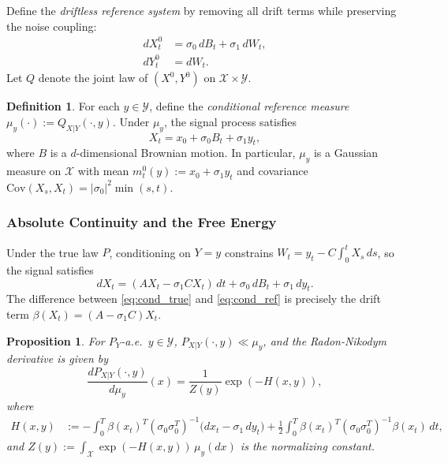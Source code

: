 \documentclass[12pt]{amsart}
\newtheorem{proposition}[theorem]{Proposition}
\theoremstyle{definition}
\newtheorem{definition}[theorem]{Definition}
\theoremstyle{remark}
\begin{document}
 Define the \emph{driftless reference system} by removing all drift terms while preserving the noise coupling:
\begin{align*}
    dX_t^0 &= \sigma_0 \, dB_t + \sigma_1 \, dW_t, \\
    dY_t^0 &= dW_t.
\end{align*}
Let $Q$ denote the joint law of $(X^0, Y^0)$ on $\mathcal{X} \times \mathcal{Y}$.

\begin{definition}\label{def:cond_ref}
    For each $y \in \mathcal{Y}$, define the \emph{conditional reference measure} $\mu_y(\cdot) := Q_{X|Y}(\cdot, y)$. Under $\mu_y$, the signal process satisfies
    \begin{equation}\label{eq:cond_ref}
        X_t = x_0 + \sigma_0 B_t + \sigma_1 y_t,
    \end{equation}
    where $B$ is a $d$-dimensional Brownian motion. In particular, $\mu_y$ is a Gaussian measure on $\mathcal{X}$ with mean $m_t^0(y) := x_0 + \sigma_1 y_t$ and covariance $\mathrm{Cov}(X_s, X_t) = |\sigma_0|^2 \min(s,t)$.
\end{definition}

\subsubsection{Absolute Continuity and the Free Energy}
Under the true law $P$, conditioning on $Y = y$ constrains $W_t = y_t - C\int_0^t X_s \, ds$, so the signal satisfies
\begin{equation}\label{eq:cond_true}
    dX_t = (AX_t - \sigma_1 CX_t) \, dt + \sigma_0 \, dB_t + \sigma_1 \, dy_t.
\end{equation}
The difference between \eqref{eq:cond_true} and \eqref{eq:cond_ref} is precisely the drift term $\beta(X_t) = (A-\sigma_1 C) X_t$.

\begin{proposition}\label{prop:ac}
    For $P_Y$-a.e.\ $y \in \mathcal{Y}$, $P_{X|Y}(\cdot, y) \ll \mu_y$, and the Radon-Nikodym derivative is given by
    \begin{equation}\label{eq:RN}
        \frac{dP_{X|Y}(\cdot, y)}{d\mu_y}(x) = \frac{1}{Z(y)} \exp\!\left(-H(x, y)\right),
    \end{equation}
    where
    \begin{align}\label{eq:energy}
        H(x, y) &:= -\int_0^T \beta(x_t)^T (\sigma_0 \sigma_0^T)^{-1} \bigl(dx_t - \sigma_1 \, dy_t\bigr) + \frac{1}{2} \int_0^T \beta(x_t)^T (\sigma_0 \sigma_0^T)^{-1} \beta(x_t) \, dt,
    \end{align}
    and $Z(y) := \int_{\mathcal{X}} \exp(-H(x,y)) \, \mu_y(dx)$ is the normalizing constant.
\end{proposition}
\end{document}

